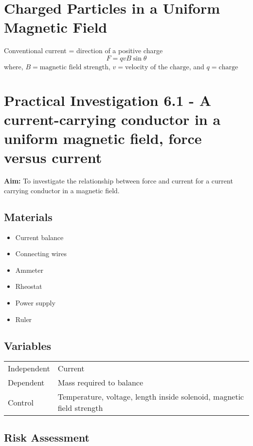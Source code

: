 \section{Charged Particles in a Uniform Magnetic Field} \label{10/02/2025}
	Conventional current = direction of a positive charge
	$$F = qvB \sin{\theta}$$
	where, $B = \text{magnetic field strength}$, $v = \text{velocity of the charge}$, and $q = \text{charge}$

\section{Practical Investigation 6.1 - A current-carrying conductor in a uniform magnetic field, force versus current} \label{20/02/2025}
	\textbf{Aim:} To investigate the relationship between force and current for a current carrying conductor in a magnetic field.

	\subsection{Materials}
		\begin{itemize}
			\item Current balance
			\item Connecting wires
			\item Ammeter
			\item Rheostat
			\item Power supply
			\item Ruler
		\end{itemize}
	
	\subsection{Variables}
	
		\begin{table}[htbp]
			\centering
			\begin{tabular}{l|l}
				Independent	& Current \\
				Dependent	& Mass required to balance \\
				Control		& Temperature, voltage, length inside solenoid, magnetic field strength
			\end{tabular}
		\end{table}
	
	\subsection{Risk Assessment}
	
